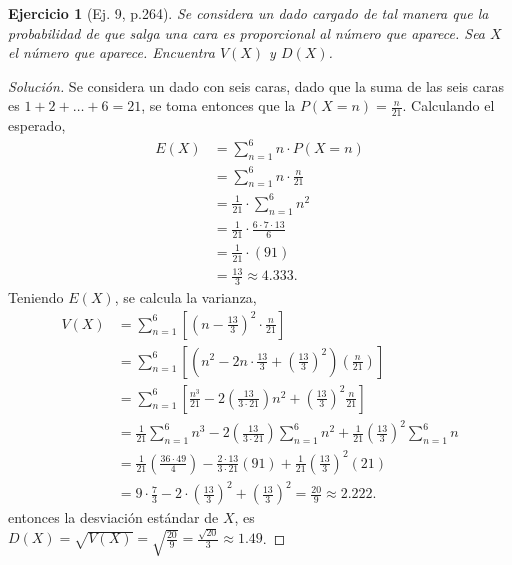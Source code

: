 \documentclass[12pt,letterpaper]{article}
\newtheorem{ej}{Ejercicio}
\begin{document}
\begin{ej}[Ej. 9, p.264]
Se considera un dado cargado de tal manera que la probabilidad de que salga una cara es proporcional al número que aparece. Sea $X$ el número que aparece. Encuentra $V(X)$ y $D(X)$.
\end{ej}
\begin{proof}[Solución]
Se considera un dado con seis caras, dado que la suma de las seis caras es  $1+2+\dots+6 = 21$, se toma entonces que la  $P(X = n) = \frac{n}{21}$. Calculando el esperado, 
	\begin{align}
		E(X) &= \sum_{n= 1}^{6} n \cdot P(X = n)\\
		&= \sum_{n = 1}^{6} n \cdot \frac{n}{21}\\
		&= \frac{1}{21} \cdot \sum_{n = 1}^{6} n^2 \\
		&= \frac{1}{21} \cdot \frac{6 \cdot 7 \cdot 13}{6}\\
		&= \frac{1}{21} \cdot  (91) \\
		&= \frac{13}{3} \approx 4.333.
	\end{align}
Teniendo $E(X)$, se calcula la varianza,
	\begin{align}
		V(X) &= \sum_{n = 1}^{6} \left\lbrack \left(n-\frac{13}{3}\right)^2 \cdot \frac{n}{21} \right\rbrack\\
		&= \sum_{n = 1}^{6} \left\lbrack \left(n^2 - 2n\cdot\frac{13}{3}+ \left(\frac{13}{3}\right)^2\right) \left(\frac{n}{21}\right) \right\rbrack\\
		&= \sum_{n = 1}^{6} \left\lbrack \frac{n^3}{21} - 2 \left(\frac{13}{3 \cdot 21}\right) n^2 + \left(\frac{13}{3}\right)^2 \frac{n}{21} \right\rbrack \\
		&= \frac{1}{21} \sum_{n = 1}^{6}  n^3 - 2 \left(\frac{13}{3 \cdot 21}\right) \sum_{n= 1}^{6} n^2 + \frac{1}{21}\left(\frac{13}{3}\right)^2 \sum_{n = 1}^{6} n \\
		&= \frac{1}{21} \left(\frac{36 \cdot 49}{4}\right) - \frac{2 \cdot 13}{3 \cdot 21} (91) + \frac{1}{21} \left(\frac{13}{3}\right)^2 (21)\\
		&= 9 \cdot \frac{7}{3} - 2 \cdot \left(\frac{13}{3}\right)^2 + \left(\frac{13}{3}\right)^2 = \frac{20}{9}\approx 2.222.
	\end{align}
	entonces la desviación estándar de $X$, es $D(X) = \sqrt{V(X)} = \sqrt{\frac{20}{9}} = \frac{\sqrt{20}}{3} \approx 1.49$.
\end{proof}
 

\end{document}
